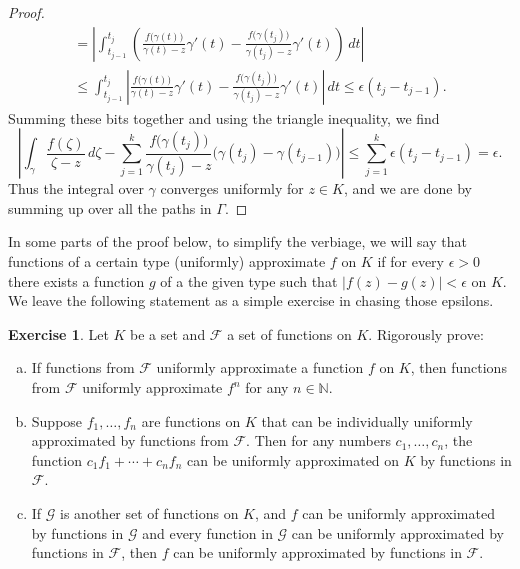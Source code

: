 \documentclass[12pt,openany]{book}
\newcommand{\sabs}[1]{\lvert {#1} \rvert}
\newcommand{\abs}[1]{\left\lvert {#1} \right\rvert}
\newcommand{\N}{{\mathbb{N}}}
\newcommand{\sF}{{\mathscr{F}}}
\newcommand{\sG}{{\mathscr{G}}}
\theoremstyle{plain}
\theoremstyle{remark}
\theoremstyle{definition}
\newenvironment{exbox}{%
    \def\FrameCommand{\vrule width 1pt \relax\hspace{10pt}}%
    \MakeFramed{\advance\hsize-\width\FrameRestore}%
}{%
    \endMakeFramed
}
\newenvironment{exparts}{%
    \leavevmode\begin{enumerate}[a),noitemsep,topsep=0pt,parsep=0pt,partopsep=0pt]
}{%
    \end{enumerate}
}
\theoremstyle{exercise}
\newtheorem{exercise}{Exercise}[section]
\theoremstyle{example}
\begin{document}
\begin{proof}
\begin{multline*}
=
\abs{
\int_{t_{j-1}}^{t_j}
\left(
\frac{f\bigl(\gamma(t)\bigr)}{\gamma(t)-z}
\gamma'(t)
-
\frac{f\bigl(\gamma(t_j)\bigr)}{\gamma(t_j)-z}
\gamma'(t)
\right)
\, dt
}
\\
\leq
\int_{t_{j-1}}^{t_j}
\abs{
\frac{f\bigl(\gamma(t)\bigr)}{\gamma(t)-z}
\gamma'(t)
-
\frac{f\bigl(\gamma(t_j)\bigr)}{\gamma(t_j)-z}
\gamma'(t)
}
\, dt
\leq \epsilon (t_j-t_{j-1}) .
\end{multline*}
Summing these bits together and using the triangle inequality, we find
\begin{equation*}
\abs{
\int_{\gamma} \frac{f(\zeta)}{\zeta-z} \, d\zeta
-
\sum_{j=1}^k
\frac{f\bigl(\gamma(t_j)\bigr)}{\gamma(t_j)-z}
\bigl( \gamma(t_j)-\gamma(t_{j-1}) \bigr)
}
\leq \sum_{j=1}^k \epsilon (t_j-t_{j-1}) = \epsilon .
\end{equation*}
Thus the integral over $\gamma$ converges uniformly for $z \in K$, and
we are done by summing up over all the paths in $\Gamma$.
\end{proof}

In some parts of the proof below, to simplify the verbiage, we will say that
functions of a certain type (uniformly) approximate $f$ on $K$
if for every $\epsilon > 0$ there exists a function $g$
of a the given type such that
$\sabs{f(z)-g(z)} < \epsilon$ on $K$.  We leave the following statement as
a simple exercise in chasing those epsilons.

\begin{exbox}
\begin{exercise} \label{exercise:approxbyfamily}
Let $K$ be a set and $\sF$ a set of functions on $K$.  Rigorously prove:
\begin{exparts}
\item
If functions from $\sF$ uniformly approximate a function $f$ on $K$,
then functions from $\sF$ uniformly approximate $f^n$ for any $n \in \N$.
\item
Suppose
$f_1,\ldots,f_n$ are functions on $K$ that can be individually
uniformly approximated
by functions from $\sF$.  Then for any numbers $c_1,\ldots,c_n$, the
function $c_1 f_1 + \cdots + c_n f_n$ can be uniformly approximated on $K$
by functions in $\sF$.
\item
If $\sG$ is another set of functions on $K$, and
$f$ can be uniformly approximated by functions in $\sG$
and every function in $\sG$ can be uniformly approximated by functions in
$\sF$, then $f$ can be uniformly approximated by functions in $\sF$.
\end{exparts}
\end{exercise}
\end{exbox}
\end{document}

